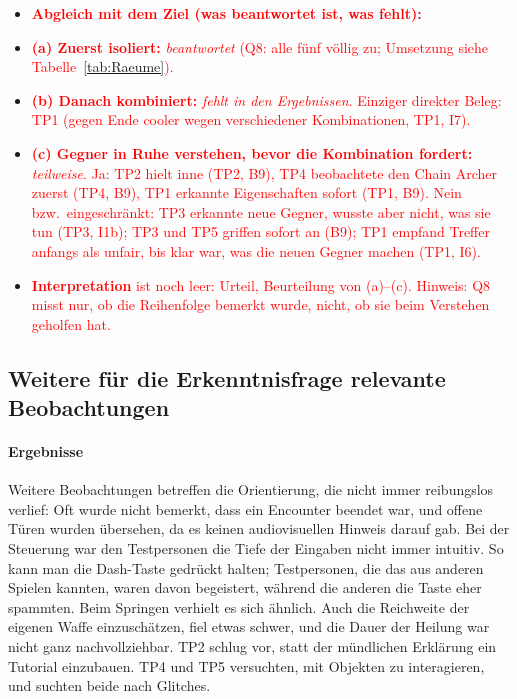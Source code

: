 \documentclass[../Main.tex]{subfiles}
\begin{document}
\begin{itemize}[leftmargin=1.5cm]
    \item \textcolor{red}{\textbf{Abgleich mit dem Ziel (was beantwortet ist, was fehlt):}}
    \item \textcolor{red}{\textbf{(a) Zuerst isoliert:} \emph{beantwortet} (Q8: alle fünf völlig zu; Umsetzung siehe Tabelle~\ref{tab:Raeume}).}
    \item \textcolor{red}{\textbf{(b) Danach kombiniert:} \emph{fehlt in den Ergebnissen}. Einziger direkter Beleg: TP1 (gegen Ende cooler wegen verschiedener Kombinationen, TP1, I7).}
    \item \textcolor{red}{\textbf{(c) Gegner in Ruhe verstehen, bevor die Kombination fordert:} \emph{teilweise}. Ja: TP2 hielt inne (TP2, B9), TP4 beobachtete den Chain Archer zuerst (TP4, B9), TP1 erkannte Eigenschaften sofort (TP1, B9). Nein bzw.\ eingeschränkt: TP3 erkannte neue Gegner, wusste aber nicht, was sie tun (TP3, I1b); TP3 und TP5 griffen sofort an (B9); TP1 empfand Treffer anfangs als unfair, bis klar war, was die neuen Gegner machen (TP1, I6).}
    \item \textcolor{red}{\textbf{Interpretation} ist noch leer: Urteil, Beurteilung von (a)--(c). Hinweis: Q8 misst nur, ob die Reihenfolge bemerkt wurde, nicht, ob sie beim Verstehen geholfen hat.}
\end{itemize}

\subsection{Weitere für die Erkenntnisfrage relevante Beobachtungen} \label{sec:WeitereBeobachtungen}

\paragraph{Ergebnisse}
Weitere Beobachtungen betreffen die Orientierung, die nicht immer reibungslos verlief: Oft wurde nicht bemerkt, dass ein Encounter beendet war, und offene Türen wurden übersehen, da es keinen audiovisuellen Hinweis darauf gab. Bei der Steuerung war den Testpersonen die Tiefe der Eingaben nicht immer intuitiv. So kann man die Dash-Taste gedrückt halten; Testpersonen, die das aus anderen Spielen kannten, waren davon begeistert, während die anderen die Taste eher spammten. Beim Springen verhielt es sich ähnlich. Auch die Reichweite der eigenen Waffe einzuschätzen, fiel etwas schwer, und die Dauer der Heilung war nicht ganz nachvollziehbar. TP2 schlug vor, statt der mündlichen Erklärung ein Tutorial einzubauen. TP4 und TP5 versuchten, mit Objekten zu interagieren, und suchten beide nach Glitches.
\end{document}
